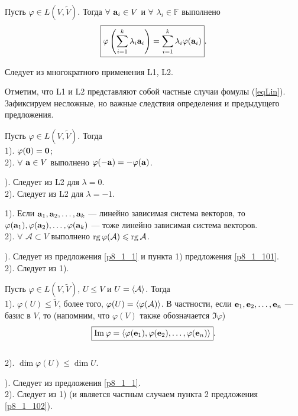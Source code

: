 \begin{predl}\label{p8_1_1}
Пусть $\varphi \in L( V, \widetilde{V})$. Тогда $\forall$ $\mathbf{a}_i\in V$ и $\forall$ $\lambda_i\in \mathbb{F}$ выполнено
 \begin{equation}\label{eqLin}
\boxed{\varphi \left(\sum\limits_{i=1}^k \lambda _i \mathbf{a}_i \right) =
\sum\limits_{i=1}^k \lambda _i \varphi (\mathbf{a}_i)}.
\end{equation}
\end{predl}
\dok
Следует из многократного применения L1, L2.
\edok

\otstup

Отметим, что L1 и L2 представляют собой частные случаи фомулы (\ref{eqLin}).
Зафиксируем несложные, но важные следствия определения и предыдущего предложения.

\begin{predl}\label{p8_1_101}
Пусть $\varphi \in L( V, \widetilde{V})$. Тогда
\\
1). $\varphi (\mathbf{0}) = \mathbf{0}$;
\\
2). $\forall$ $\mathbf{a}\in V$ выполнено $\varphi(-\mathbf{a})=-\varphi(\mathbf{a})$.
\end{predl}
). Следует из L2 для $\lambda= 0$.\\
2). Следует из L2 для $\lambda= -1$.
\edok

\begin{predl}\label{p8_1_102}
1). Если $\mathbf{a}_1, \mathbf{a}_2, \ldots , \mathbf{a}_k$  --- линейно зависимая система векторов, то
$\varphi(\mathbf{a}_1), \varphi(\mathbf{a}_2), \ldots , \varphi(\mathbf{a}_k)$
 --- тоже линейно зависимая система векторов.
\\
2). $\forall$ $\mathcal{A}\subset V$ выполнено $\mathop{\rm rg}\nolimits \varphi (\mathcal{A}) \leqslant \mathop{\rm rg}\nolimits \mathcal{A}$.
\end{predl}
).  Следует из предложения \ref{p8_1_1} и пункта 1) предложения \ref{p8_1_101}.\\
2). Следует из 1).
\edok

\begin{predl}\label{p8_1_103}
Пусть $\varphi \in L( V, \widetilde{V})$, $U\leq V$ и $U=\langle \mathcal{A} \rangle$. Тогда \\
1). $\varphi (U)\leq \widetilde{V}$, более того, $\varphi (U)=\langle \varphi ( \mathcal{A} )  \rangle$.
В частности, если $\mathbf{e}_1, \mathbf{e}_2, \ldots , \mathbf{e}_n$ --- базис в $V$, 
то (напомним, что $\varphi(V)$ также обозначается $\Im \varphi$)
$$\boxed{\mathop{\rm Im}\nolimits \varphi =  \langle \varphi(\mathbf{e}_1), \varphi(\mathbf{e}_2), \ldots , \varphi(\mathbf{e}_n) \rangle}.$$
\\
2). $\dim \varphi(U) \leq \dim U$.
\end{predl}
). Следует из предложения \ref{p8_1_1}.\\
2). Следует из 1) (и является частным случаем пункта 2 предложения \ref{p8_1_102}). 
\edok

